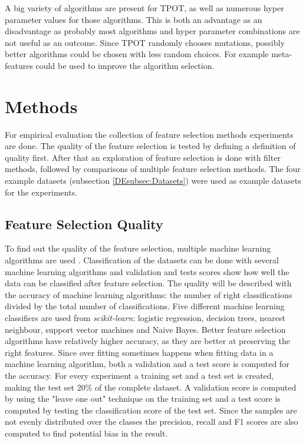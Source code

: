 \documentclass[10pt,a4paper]{report}
\begin{document}
	A big variety of algorithms are present for TPOT, as well as numerous hyper parameter values for those algorithms. This is both an advantage as an disadvantage as probably most algorithms and hyper parameter combinations are not useful as an outcome. Since TPOT randomly chooses mutations, possibly better algorithms could be chosen with less random choices. For example meta-features could be used to improve the algorithm selection.

	\section{Methods}
	\label{FSsec:Methods}
	
	For empirical evaluation the collection of feature selection methods experiments are done. The quality of the feature selection is tested by defining a definition of quality first. After that an exploration of feature selection is done with filter methods, followed by comparisons of multiple feature selection methods. The four example datasets (subsection \ref{DEsubsec:Datasets}) were used as example datasets for the experiments.
	
	\subsection{Feature Selection Quality}
	\label{FSsubsec:DimensionalityReductionQuality}
	
	To find out the quality of the feature selection, multiple machine learning algorithms are used \cite{hall1998practical}.  Classification of the datasets can be done with several machine learning algorithms and validation and tests scores show how well the data can be classified after feature selection. The quality will be described with the accuracy of machine learning algorithms: the number of right classifications divided by the total number of classifications. Five different machine learning classifiers are used from \textit{scikit-learn}: logistic regression, decision trees, nearest neighbour, support vector machines and Naive Bayes. Better feature selection algorithms have relatively higher accuracy, as they are better at preserving the right features. Since over fitting sometimes happens when fitting data in a machine learning algorithm, both a validation and a test score is computed for the accuracy. For every experiment a training set and a test set is created, making the test set 20\% of the complete dataset. A validation score is computed by using the "leave one out" technique on the training set and a test score is computed by testing the classification score of the test set. Since the samples are not evenly distributed over the classes the precision, recall and F1 scores are also computed to find potential bias in the result.
	
\end{document}

